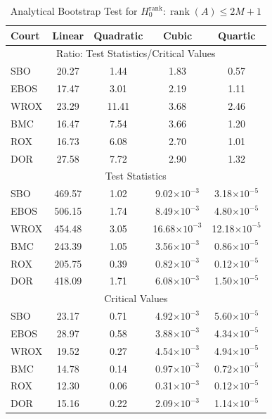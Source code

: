 \documentclass[11pt]{article}
\theoremstyle{definition}
\DeclareMathOperator*{\rank}{rank}
\newcommand{\0}{\ensuremath{\mathbf{0}}}
\begin{document}
\begin{bibunit}
%
\begin{table}[htbp]
  \centering
  \caption{Analytical Bootstrap Test for $H_0^{\text{rank}}: \rank(A) \leq 2M+1$}
    \begin{tabular}{lcccc}
    \toprule
    Court & Linear & Quadratic & Cubic & Quartic \\
    \midrule
    \multicolumn{5}{c}{Ratio: Test Statistics/Critical Values} \\
    SBO   & 20.27 & 1.44  & 1.83 & 0.57 \\
    EBOS  & 17.47 & 3.01  & 2.19 & 1.11 \\
    WROX  & 23.29 & 11.41 & 3.68 & 2.46 \\
    BMC   & 16.47 & 7.54  & 3.66 & 1.20 \\
    ROX   & 16.73 & 6.08  & 2.70 & 1.01 \\
    DOR   & 27.58 & 7.72  & 2.90 & 1.32 \\
    \midrule
    \multicolumn{5}{c}{Test Statistics} \\
    SBO   & 469.57 & 1.02 & 9.02$\times 10^{-3}$ & 3.18$\times 10^{-5}$ \\
    EBOS  & 506.15 & 1.74 & 8.49$\times 10^{-3}$ & 4.80$\times 10^{-5}$ \\
    WROX  & 454.48 & 3.05 & 16.68$\times 10^{-3}$ & 12.18$\times 10^{-5}$ \\
    BMC   & 243.39 & 1.05 & 3.56$\times 10^{-3}$ & 0.86$\times 10^{-5}$ \\
    ROX   & 205.75 & 0.39 & 0.82$\times 10^{-3}$ & 0.12$\times 10^{-5}$ \\
    DOR   & 418.09 & 1.71 & 6.08$\times 10^{-3}$ & 1.50$\times 10^{-5}$ \\
    \midrule
    \multicolumn{5}{c}{Critical Values} \\
    SBO   & 23.17 & 0.71 & 4.92$\times 10^{-3}$ & 5.60$\times 10^{-5}$ \\
    EBOS  & 28.97 & 0.58 & 3.88$\times 10^{-3}$ & 4.34$\times 10^{-5}$ \\
    WROX  & 19.52 & 0.27 & 4.54$\times 10^{-3}$ & 4.94$\times 10^{-5}$ \\
    BMC   & 14.78 & 0.14 & 0.97$\times 10^{-3}$ & 0.72$\times 10^{-5}$ \\
    ROX   & 12.30 & 0.06 & 0.31$\times 10^{-3}$ & 0.12$\times 10^{-5}$ \\
    DOR   & 15.16 & 0.22 & 2.09$\times 10^{-3}$ & 1.14$\times 10^{-5}$ \\
    \bottomrule
    \end{tabular}%
  \label{tab:IVstrength_CF19}%
\end{table}%





\end{bibunit}
\end{document}

